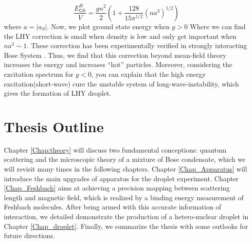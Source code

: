 \begin{equation}
\frac{E_{\text{GS}}^R}{V}=\frac{g n^2}{2}\left(1+\frac{128}{15\pi ^{1/2}} \left(n a^3\right)^{1/2}\right)
\end{equation}
where $a=\left|a_S\right|$. Now, we plot ground state energy when $g>0$
Where we can find the LHY correction is small when density is low and only get important when $n a^3\sim 1$. These correction has been experimentally verified in strongly interacting Bose System \cite{Navon2011}. Thus, we find that this correction beyond mean-field theory increases the energy and increases ``hot'' particles. Moreover, considering the excitation spectrum for $g<0$, you can explain that the high energy excitation(short-wave) cure the unstable system of long-wave-instability, which gives the formation of LHY droplet.



\section{Thesis Outline}
\label{sec:intro-outline}
Chapter \ref{Chap:theory} will discuss two fundamental conceptions: quantum scattering and the microscopic theory of a mixture of Bose condensate, which we will revisit many times in the following chapters. Chapter \ref{Chap_Apparatus} will introduce the main upgrades of apparatus for the droplet experiment. Chapter \ref{Chap_Feshbach} aims at achieving a precision mapping between scattering length and magnetic field, which is realized by a binding energy measurement of Feshbach molecules. After being armed with this accurate information of interaction, we detailed demonstrate the production of a hetero-nuclear droplet in Chapter \ref{Chap_droplet}. 
Finally, we summarize the thesis with some outlooks for future directions.

\chapterend
